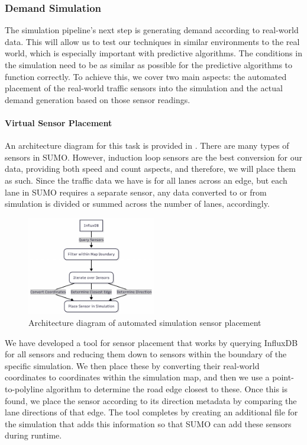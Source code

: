 \subsubsection{Demand Simulation}
The simulation pipeline's next step is generating demand according to real-world data. This will allow us to test our techniques in similar environments to the real world, which is especially important with predictive algorithms. The conditions in the simulation need to be as similar as possible for the predictive algorithms to function correctly. To achieve this, we cover two main aspects: the automated placement of the real-world traffic sensors into the simulation and the actual demand generation based on those sensor readings.

\paragraph{Virtual Sensor Placement}
An architecture diagram for this task is provided in . There are many types of sensors in SUMO. However, induction loop sensors are the best conversion for our data, providing both speed and count aspects, and therefore, we will place them as such. Since the traffic data we have is for all lanes across an edge, but each lane in SUMO requires a separate sensor, any data converted to or from simulation is divided or summed across the number of lanes, accordingly.

\begin{figure}[!ht]
  \centering
  \includegraphics[width=0.5\textwidth]{images/design-implementation/sensor-placement.pdf}
  \caption{Architecture diagram of automated simulation sensor placement}
  \label{fig:sensor-placement}
\end{figure}

We have developed a tool for sensor placement that works by querying InfluxDB for all sensors and reducing them down to sensors within the boundary of the specific simulation. We then place these by converting their real-world coordinates to coordinates within the simulation map, and then we use a point-to-polyline algorithm to determine the road edge closest to these. Once this is found, we place the sensor according to its direction metadata by comparing the lane directions of that edge. The tool completes by creating an additional file for the simulation that adds this information so that SUMO can add these sensors during runtime.

